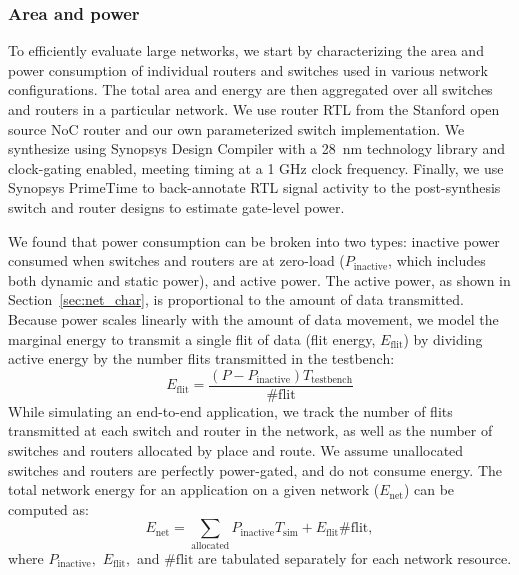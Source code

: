 \subsubsection{Area and power}
To efficiently evaluate large networks, we start by characterizing the area and power consumption of individual routers and switches
used in various network configurations. 
The total area and energy are then aggregated over all switches and routers in a particular network.
We use router RTL from the Stanford open source NoC router \cite{becker2012efficient} and our own parameterized switch implementation.
We synthesize using Synopsys Design Compiler with a \SI{28}{nm} technology library and clock-gating enabled, meeting timing at a 1 GHz clock frequency.
Finally, we use Synopsys PrimeTime to back-annotate RTL signal activity to the post-synthesis switch and router designs to estimate gate-level power.

We found that power consumption can be broken into two types: 
inactive power consumed when switches and routers are at zero-load ($P_{\text{inactive}}$, which includes both dynamic and static power),
and active power. The active power, as shown in Section~\ref{sec:net_char}, is proportional to the amount of
data transmitted. 
Because power scales linearly with the amount of data movement, we model the marginal energy to transmit a single flit of data (flit energy, $E_{\text{flit}}$) by dividing active energy by the number flits transmitted in the testbench:
\begin{equation}
  E_{\text{flit}} = \frac{\left(P-P_{\text{inactive}}\right) T_{\text{testbench}}}{\#\text{flit}} 
\end{equation}
While simulating an end-to-end application, we track the number of flits transmitted at each switch and router in the network, as well as the number of switches and routers allocated by place and route. 
We assume unallocated switches and routers are perfectly power-gated, and do not consume energy.
The total network energy for an application on a given network ($E_{\text{net}}$) can be computed as:
\begin{equation}
  E_{\text{net}} = \sum_{\text{allocated}} P_{\text{inactive}} T_{\text{sim}}
  + E_{\text{flit}}  \#\text{flit},
\end{equation}
where $P_{\text{inactive}},$ $E_{\text{flit}},$ and $\#\text{flit}$ are tabulated separately for each network resource.

